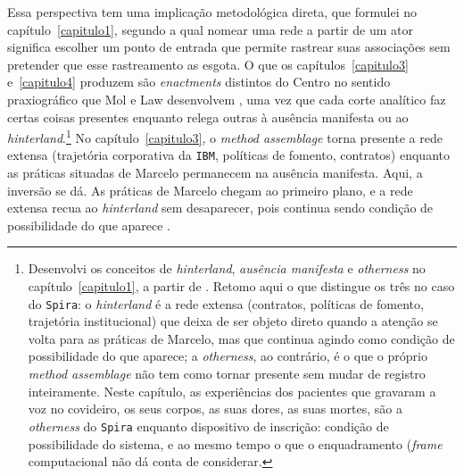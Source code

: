 Essa perspectiva tem uma implicação metodológica direta, que formulei no capítulo~\ref{capitulo1}, segundo a qual nomear uma rede a partir de um ator significa escolher um ponto de entrada que permite rastrear suas associações sem pretender que esse rastreamento as esgota. O que os capítulos~\ref{capitulo3} e~\ref{capitulo4} produzem são \textit{enactments} distintos do Centro no sentido praxiográfico que Mol e Law desenvolvem \parencite{MolLaw1994, Law2004After}, uma vez que cada corte analítico faz certas coisas presentes enquanto relega outras à ausência manifesta ou ao \textit{hinterland}.\footnote{Desenvolvi os conceitos de \textit{hinterland}, \textit{ausência manifesta} e \textit{otherness} no capítulo~\ref{capitulo1}, a partir de \textcite[pp.~34--42, 83--85]{Law2004After}. Retomo aqui o que distingue os três no caso do \texttt{Spira}: o \textit{hinterland} é a rede extensa (contratos, políticas de fomento, trajetória institucional) que deixa de ser objeto direto quando a atenção se volta para as práticas de Marcelo, mas que continua agindo como condição de possibilidade do que aparece; a \textit{otherness}, ao contrário, é o que o próprio \textit{method assemblage} não tem como tornar presente sem mudar de registro inteiramente. Neste capítulo, as experiências dos pacientes que gravaram a voz no covideiro, os seus corpos, as suas dores, as suas mortes, são a \textit{otherness} do \texttt{Spira} enquanto dispositivo de inscrição: condição de possibilidade do sistema, e ao mesmo tempo o que o enquadramento (\textit{frame} computacional não dá conta de considerar.} No capítulo~\ref{capitulo3}, o \textit{method assemblage} torna presente a rede extensa (trajetória corporativa da \texttt{IBM}, políticas de fomento, contratos) enquanto as práticas situadas de Marcelo permanecem na ausência manifesta. Aqui, a inversão se dá. As práticas de Marcelo chegam ao primeiro plano, e a rede extensa recua ao \textit{hinterland} sem desaparecer, pois continua sendo condição de possibilidade do que aparece \parencite[pp.~40--41]{Law2004After}.

